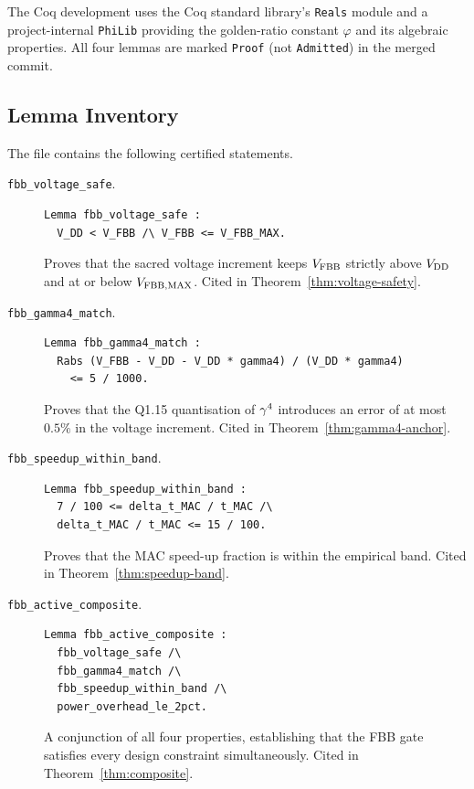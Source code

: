 The Coq development uses the Coq standard library's \texttt{Reals} module
and a project-internal \texttt{PhiLib} providing the golden-ratio constant
$\varphi$ and its algebraic properties.  All four lemmas are marked
\texttt{Proof} (not \texttt{Admitted}) in the merged commit.

\subsection{Lemma Inventory}
\label{subsec:coq-lemmas}

The file \coqfile{} contains the following certified statements.

\begin{description}
  \item[\texttt{fbb\_voltage\_safe}.]
    \begin{verbatim}
Lemma fbb_voltage_safe :
  V_DD < V_FBB /\ V_FBB <= V_FBB_MAX.
    \end{verbatim}
    Proves that the sacred voltage increment keeps $V_{\mathrm{FBB}}{}$ strictly
    above $V_{\mathrm{DD}}{}$ and at or below $V_{\mathrm{FBB,MAX}}{}$.
    Cited in Theorem~\ref{thm:voltage-safety}.

  \item[\texttt{fbb\_gamma4\_match}.]
    \begin{verbatim}
Lemma fbb_gamma4_match :
  Rabs (V_FBB - V_DD - V_DD * gamma4) / (V_DD * gamma4)
    <= 5 / 1000.
    \end{verbatim}
    Proves that the Q1.15 quantisation of $\gamma^{4}{}$ introduces an error
    of at most $0.5\%$ in the voltage increment.
    Cited in Theorem~\ref{thm:gamma4-anchor}.

  \item[\texttt{fbb\_speedup\_within\_band}.]
    \begin{verbatim}
Lemma fbb_speedup_within_band :
  7 / 100 <= delta_t_MAC / t_MAC /\
  delta_t_MAC / t_MAC <= 15 / 100.
    \end{verbatim}
    Proves that the MAC speed-up fraction is within the empirical band.
    Cited in Theorem~\ref{thm:speedup-band}.

  \item[\texttt{fbb\_active\_composite}.]
    \begin{verbatim}
Lemma fbb_active_composite :
  fbb_voltage_safe /\
  fbb_gamma4_match /\
  fbb_speedup_within_band /\
  power_overhead_le_2pct.
    \end{verbatim}
    A conjunction of all four properties, establishing that the FBB gate
    satisfies every design constraint simultaneously.
    Cited in Theorem~\ref{thm:composite}.
\end{description}

